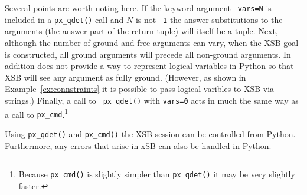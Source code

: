 \begin{example}
Several points are worth noting here.  If the keyword argument {\tt
  vars=N} is included in a {\tt px\_qdet()} call and $N$ is not {\tt
  1} the answer substitutions to the arguments (the answer part of the
return tuple) will itself be a tuple.  Next, although the number of
ground and free arguments can vary, when the XSB goal is constructed,
all ground arguments will precede all non-ground arguments.  In
addition \px{} does not provide a way to represent logical variables
in Python so that XSB will see any argument as fully ground.
(However, as shown in Example~\ref{ex:connstraints} it is possible to
pass logical varibles to XSB via strings.)  Finally, a call to {\tt
  px\_qdet()} with {\tt vars=0} acts in much the same way as a call to
{\tt px\_cmd}.\footnote{Because {\tt px\_cmd()} is slightly simpler
  than {\tt px\_qdet()} it may be very slightly faster.}
\end{example}

Using {\tt px\_qdet()} and {\tt px\_cmd()} the XSB session can be
controlled from Python.  Furthermore, any errors that arise in xSB can
also be handled in Python.

